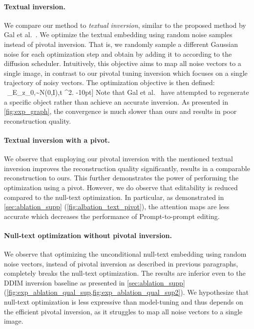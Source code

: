 \vspace{-0.4cm}
\paragraph{Textual inversion.}
We compare our method to \textit{textual inversion}, similar to the proposed method by Gal et al.~\cite{gal2022image}. We optimize the textual embedding  using random noise samples instead of pivotal inversion. 
That is, we randomly sample a different Gaussian noise for each optimization step and obtain  by adding it to  according to the diffusion scheduler. Intuitively, this objective aims to map all noise vectors to a single image, in contrast to our pivotal tuning inversion which focuses on a single trajectory of noisy vectors. The optimization objective is then defined: \
\min_\textemb E_{z_0,\eps\sim N(0,I),t} ^2.
-10pt]
Note that Gal et al.~\cite{gal2022image} have attempted to regenerate a specific object rather than achieve an accurate inversion. As presented in \cref{fig:exp_graph}, the convergence is much slower than ours and results in poor reconstruction quality.




\vspace{-0.4cm}
\paragraph{Textual inversion with a pivot.}
We observe that employing our pivotal inversion with the mentioned textual inversion improves the reconstruction quality significantly, results in a comparable reconstruction to ours. This further demonstrates the power of performing the optimization using a pivot. However, we do observe that editability is reduced compared to the null-text optimization. In particular, as demonstrated in \cref{sec:ablation_supp} (\cref{fig:albation_text_pivot}), the attention maps are less accurate which decreases the performance of Prompt-to-prompt editing.








\vspace{-0.4cm}
\paragraph{Null-text optimization without pivotal inversion.}
We observe that optimizing the unconditional null-text embedding using random noise vectors, instead of pivotal inversion as described in previous paragraphs, completely breaks the null-text optimization. The results are inferior even to the DDIM inversion baseline as presented in \cref{sec:ablation_supp} (\cref{fig:exp_ablation_qual_sup,fig:exp_ablation_qual_sup2}). We hypothesize that null-text optimization is less expressive than model-tuning and thus depends on the efficient pivotal inversion, as it struggles to map all noise vectors to a single image. 




